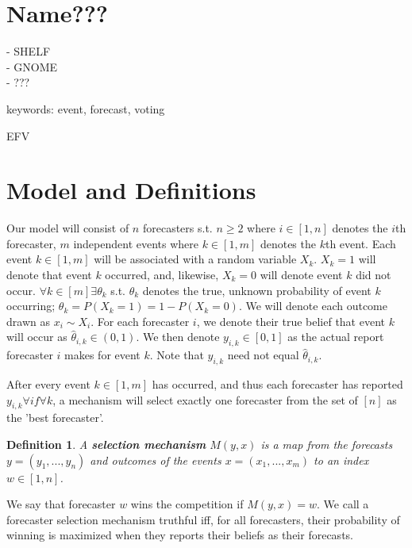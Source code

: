 \documentclass[letterpaper,12pt]{article}
\renewenvironment{abstract}
 {
  \begin{center}
  \vspace{3em} \bfseries \abstractname\vspace{0em}\vspace{0pt}
  \end{center}
  \list{}{%
    \setlength{\leftmargin}{20mm}%
    \setlength{\rightmargin}{\leftmargin}%
  }%
  \item\relax}
 {\endlist}
\newcommand{\1}{\mathbbm{1}}
\newtheorem{definition}[theorem]{Definition}
\begin{document}


 
\section{Name???}
- SHELF\\
- GNOME\\
- ???


keywords: event, forecast, voting

EFV

\section{Model and Definitions}
Our model will consist of $n$ forecasters s.t. $n \ge 2$ where $i \in [1,n]$ denotes the $i$th forecaster, $m$ independent events where $k \in [1,m]$ denotes the $k$th event. Each event $k \in [1,m]$ will be associated with a random variable $X_k$. $X_k = 1$ will denote that event $k$ occurred, and, likewise, $X_k = 0$ will denote event $k$ did not occur. $\forall k \in [m] \exists \theta_k$ s.t. $\theta_k$ denotes the true, unknown probability of event $k$ occurring;  $\theta_k = P(X_k = 1) = 1 - P(X_k = 0)$. We will denote each outcome drawn as $x_i \sim X_i$. For each forecaster $i$, we denote their true belief that event $k$ will occur as $\hat{\theta}_{i,k} \in (0,1)$. We then denote $y_{i,k} \in [0,1]$ as the actual report forecaster $i$ makes for event $k$. Note that $y_{i,k}$ need not equal $\hat{\theta}_{i,k}$. 

After every event $k \in [1,m]$ has occurred, and thus each forecaster has reported $y_{i,k} \forall i f\forall k$, a mechanism will select exactly one forecaster from the set of $[n]$ as the 'best forecaster'.

\begin{definition}
  \label{mechanism}
  A \textbf{selection mechanism} $M(y, x)$ is a map from the forecasts $y = (y_1, ..., y_n)$ and outcomes of the events $x = (x_1, ..., x_m)$ to an index $w \in [1, n]$.
\end{definition}
We say that forecaster $w$ wins the competition if $M(y, x) = w$. We call a forecaster selection mechanism truthful iff, for all forecasters, their probability of winning is maximized when they reports their beliefs as their forecasts.
\end{document}
